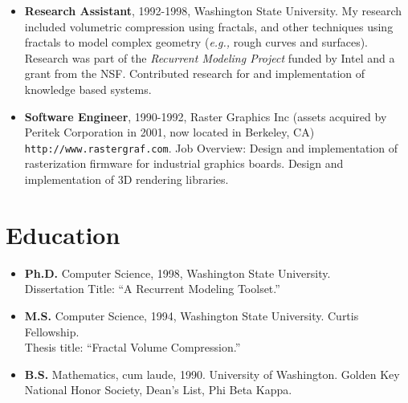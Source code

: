 \documentclass[10pt]{article}
\begin{document}
\begin{itemize}
\item {\bf Research Assistant}, 1992-1998,
Washington State University.
My research included volumetric compression using fractals,
and other techniques using fractals to model complex geometry
({\it e.g.,} rough curves and surfaces). Research was part of the
{\em Recurrent Modeling Project} funded by Intel and a grant
from the NSF.
Contributed research for and implementation of knowledge based systems.

\item {\bf Software Engineer}, 1990-1992,
Raster Graphics Inc
(assets acquired by Peritek Corporation in 2001, now
located in Berkeley, CA)
{\tt http://www.rastergraf.com}.
Job Overview: 
Design and implementation of rasterization firmware for
industrial graphics boards. Design and implementation of
3D rendering libraries.
\end{itemize}


\section*{Education}

\begin{itemize}
\item {\bf Ph.D.} Computer Science, 1998,
Washington State University. \\
Dissertation Title: ``A Recurrent Modeling Toolset.''

\item {\bf M.S.} Computer Science, 1994,
Washington State University. Curtis Fellowship. \\
Thesis title: ``Fractal Volume Compression.''


\item {\bf B.S.} Mathematics, cum laude, 1990.
University of Washington. 
Golden Key National Honor Society, Dean's List, Phi Beta Kappa.
\end{itemize}
\end{document}

